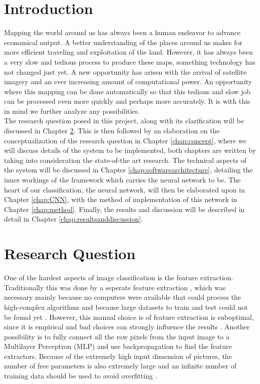 \documentclass[a4paper,onecolumn]{report}
\begin{document}
{\small \tableofcontents}


\chapter{Introduction}

Mapping the world around us has always been a human endeavor to advance economical output. A better understanding of the places around us makes for more efficient traveling and exploitation of the land. However, it has always been a very slow and tedious process to produce these maps, something technology has not changed just yet. A new opportunity has arisen with the arrival of satellite imagery and an ever increasing amount of computational power. An opportunity where this mapping can be done automatically so that this tedious and slow job can be processed even more quickly and perhaps more accurately. It is with this in mind we further analyze any possibilities.\\

The research question posed in this project, along with its clarification will be discussed in Chapter \ref{chap:researchquestion}. This is then followed by an elaboration on the conceptualization of the research question in Chapter \ref{chap:concept}, where we will discuss details of the system to be implemented, both chapters are written by taking into consideration the state-of-the art research.  The technical aspects of the system will be discussed in Chapter \ref{chap:softwarearchitecture}, detailing the inner workings of the framework which carries the neural network to be. The heart of our classification, the neural network, will then be elaborated upon in Chapter \ref{chap:CNN}, with the method of implementation of this network in Chapter \ref{chap:method}. Finally, the results and discussion will be described in detail in Chapter \ref{chap:resultsanddiscussion}.

\chapter{Research Question}
\label{chap:researchquestion}
One of the hardest aspects of image classification is the feature extraction. Traditionally this was done by a seperate feature extraction \cite{duda1973pattern}, which was necessary mainly because no computers were available that could process the high-complex algorithms and because large datasets to train and test could not be found yet \cite{lecun1998gradient}. However, this manual choice is of feature extraction is suboptimal, since it is empirical and bad choices can strongly influence the results \cite{duffner2008face}. 
Another possibility is to fully connect all the raw pixels from the input image to a Multilayer Perceptron (MLP) and use backpropagation to find the feature extractors. Because of the extremely high input dimension of pictures, the number of free parameters is also extremely large and an infinite number of training data should be used to avoid overfitting \cite{hawkins2004problem}. \\
\end{document}
